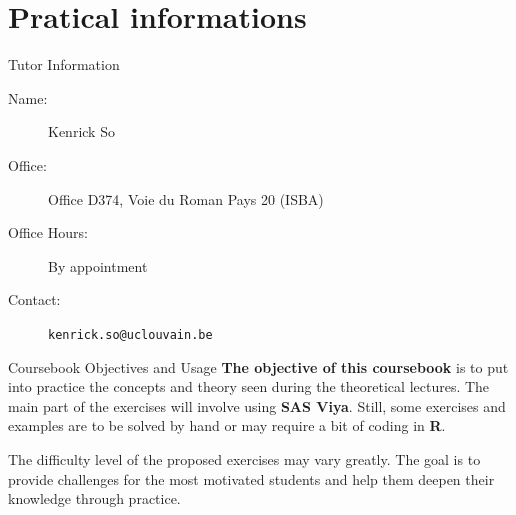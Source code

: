 \section{Pratical informations}
\begin{frame}[fragile]{Tutor Information}
\begin{description}
  \item[Name:] Kenrick So
  \item[Office:] Office D374, Voie du Roman Pays 20 (ISBA)
  \item[Office Hours:] By appointment
  \item[Contact:] \texttt{kenrick.so@uclouvain.be}
\end{description}
\end{frame}

\begin{frame}[fragile]{Coursebook Objectives and Usage}
\textbf{The objective of this coursebook} is to put into practice the concepts and theory 
seen during the theoretical lectures. The main part of the exercises will involve using 
\textbf{SAS Viya}. Still, some exercises and examples are to be solved by hand or may 
require a bit of coding in \textbf{R}.

\vspace{0.3cm}
The difficulty level of the proposed exercises may vary greatly. The goal is to provide challenges for the most motivated students and help them deepen their knowledge through practice.
\end{frame}

